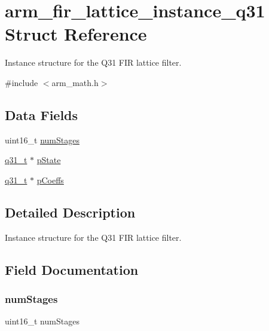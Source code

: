 \hypertarget{structarm__fir__lattice__instance__q31}{}\section{arm\+\_\+fir\+\_\+lattice\+\_\+instance\+\_\+q31 Struct Reference}
\label{structarm__fir__lattice__instance__q31}


Instance structure for the Q31 F\+IR lattice filter.  




{\ttfamily \#include $<$arm\+\_\+math.\+h$>$}

\subsection*{Data Fields}
\begin{DoxyCompactItemize}
\item 
uint16\+\_\+t \mbox{\hyperlink{structarm__fir__lattice__instance__q31_a4cceb90547b3e585d4c7aabaa8057212}{num\+Stages}}
\item 
\mbox{\hyperlink{arm__math_8h_adc89a3547f5324b7b3b95adec3806bc0}{q31\+\_\+t}} $\ast$ \mbox{\hyperlink{structarm__fir__lattice__instance__q31_adee4ba3ee8869865af7d8fa08ca913d6}{p\+State}}
\item 
\mbox{\hyperlink{arm__math_8h_adc89a3547f5324b7b3b95adec3806bc0}{q31\+\_\+t}} $\ast$ \mbox{\hyperlink{structarm__fir__lattice__instance__q31_a68888e36167d81cb7836db10367a1682}{p\+Coeffs}}
\end{DoxyCompactItemize}


\subsection{Detailed Description}
Instance structure for the Q31 F\+IR lattice filter. 

\subsection{Field Documentation}
\mbox{\label{structarm__fir__lattice__instance__q31_a4cceb90547b3e585d4c7aabaa8057212}} 
\subsubsection{\texorpdfstring{numStages}{numStages}}
{\footnotesize\ttfamily uint16\+\_\+t num\+Stages}

